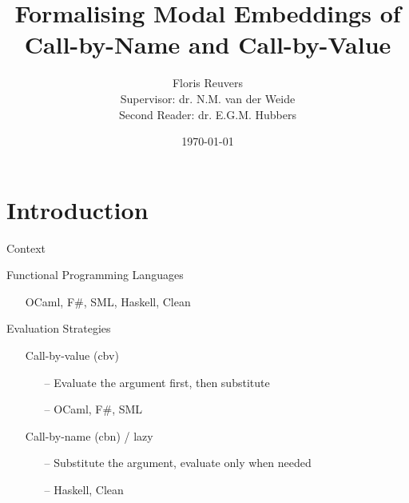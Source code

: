 \documentclass{beamer}
\title{Formalising Modal Embeddings of Call-by-Name and Call-by-Value}
\date{\today}
\author[Floris Reuvers]{Floris Reuvers \\[1ex]
  \small Supervisor: dr. N.M. van der Weide \\
  \small Second Reader: dr. E.G.M. Hubbers
}
\institute{Radboud University} %
\theoremstyle{definition}
\begin{document}
  \maketitle
  
  \section{Introduction}

  \begin{frame}{Context}
    \begin{block}{Functional Programming Languages} \pause
      \begin{itemize}
        \item[\textbullet] OCaml, F\#, SML, Haskell, Clean \pause
      \end{itemize}
    \end{block}

    \begin{block}{Evaluation Strategies}  \pause
      \begin{itemize}
        \item[\textbullet] \alert{Call-by-value} (\textsf{cbv}) \pause
          \begin{itemize}
            \item[--] Evaluate the argument first, then substitute \pause
            \item[--] OCaml, F\#, SML \pause
          \end{itemize}
        \item[\textbullet] \alert{Call-by-name} (\textsf{cbn}) / lazy \pause
          \begin{itemize}
            \item[--] Substitute the argument, evaluate only when needed \pause
            \item[--] Haskell, Clean
          \end{itemize}
      \end{itemize}
    \end{block}
  \end{frame}
\end{document}
